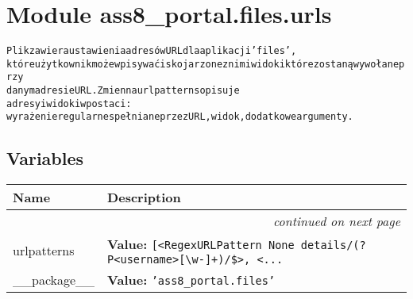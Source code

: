 %
%
%


\section{Module ass8\_portal.files.urls}

    \label{ass8_portal:files:urls}
\begin{alltt}

Plik zawiera ustawienia adresów URL dla aplikacji 'files', 
które użytkownik może wpisywać i skojarzone z nimi widoki które zostaną wywołane przy 
danym adresie URL. Zmienna urlpatterns opisuje 
adresy i widoki w postaci: 
    wyrażenie regularne spełniane przez URL, widok, dodatkowe argumenty.
\end{alltt}



  \subsection{Variables}

    \vspace{-1cm}
\hspace{\varindent}\begin{longtable}{|p{\varnamewidth}|p{\vardescrwidth}|l}
\cline{1-2}
\cline{1-2} \centering \textbf{Name} & \centering \textbf{Description}& \\
\cline{1-2}
\endhead\cline{1-2}\multicolumn{3}{r}{\small\textit{continued on next page}}\\\endfoot\cline{1-2}
\endlastfoot\raggedright u\-r\-l\-p\-a\-t\-t\-e\-r\-n\-s\- & \raggedright \textbf{Value:} 
{\tt \texttt{[}{\textless}RegexURLPattern None details/(?P{\textless}username{\textgreater}[{\textbackslash}w-]+)/\${\textgreater}\texttt{, }{\textless}\texttt{...}}&\\
\cline{1-2}
\raggedright \_\-\_\-p\-a\-c\-k\-a\-g\-e\-\_\-\_\- & \raggedright \textbf{Value:} 
{\tt \texttt{'}\texttt{ass8\_portal.files}\texttt{'}}&\\
\cline{1-2}
\end{longtable}

